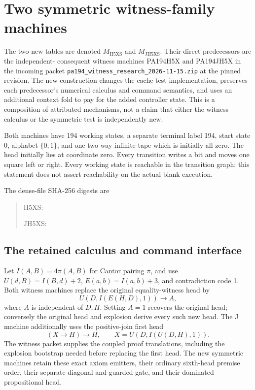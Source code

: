 \section{Two symmetric witness-family machines}
\label{sec:symmetric-witness}

The two new tables are denoted $M_{\mathrm{H5XS}}$ and
$M_{\mathrm{JH5XS}}$.  Their direct predecessors are the independent-
consequent witness machines PA194H5X and PA194JH5X in the incoming packet
\texttt{pa194\_witness\_research\_2026-11-15.zip} at the pinned revision.
The new construction changes the cache-test implementation, preserves
each predecessor's numerical calculus and command semantics, and uses an
additional context fold to pay for the added controller state.  This is
a composition of attributed mechanisms, not a claim that either the
witness calculus or the symmetric test is independently new.

Both machines have 194 working states, a separate terminal label 194,
start state 0, alphabet $\{0,1\}$, and one two-way infinite tape which is
initially all zero.  The head initially lies at coordinate zero.  Every
transition writes a bit and moves one square left or right.  Every
working state is reachable in the transition graph; this statement does
not assert reachability on the actual blank execution.

The dense-file SHA-256 digests are
\begin{quote}\small\ttfamily
H5XS: 

JH5XS: 
\end{quote}

\subsection{The retained calculus and command interface}

Let $I(A,B)=4\pi(A,B)$ for Cantor pairing $\pi$, and use
$U(d,B)=I(B,d)+2$, $E(a,b)=I(a,b)+3$, and contradiction code 1.
Both witness machines replace the original equality-witness head by
\[
  U(D,I(E(H,D),1))\longrightarrow A,
\]
where $A$ is independent of $D,H$.  Setting $A=1$ recovers the original
head; conversely the original head and explosion derive every such new
head.  The J machine additionally uses the positive-join first head
\[
  (X\longrightarrow H)\longrightarrow H,
  \qquad X=U(D,I(U(D,H),1)).
\]
The witness packet supplies the coupled proof translations, including the
explosion bootstrap needed before replacing the first head.  The new
symmetric machines retain these exact axiom emitters, their ordinary
sixth-head premise order, their separate diagonal and guarded gate, and
their dominated propositional head.

